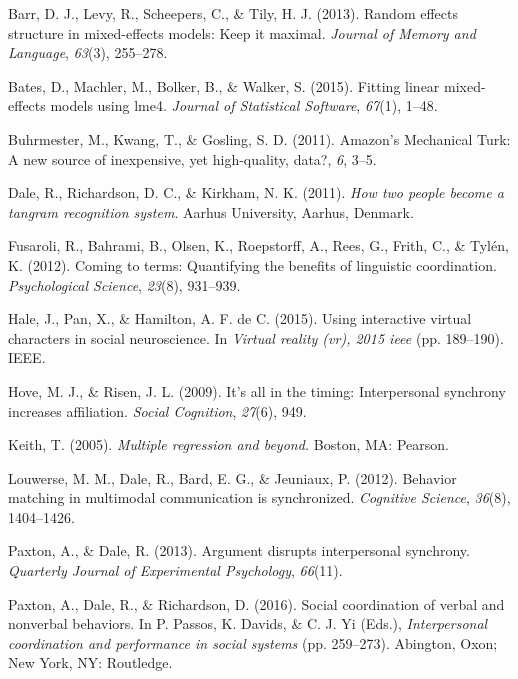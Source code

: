 \documentclass[10pt, letterpaper]{article}
\begin{document}
\hypertarget{refs}{}
\hypertarget{ref-barr2013random}{}
Barr, D. J., Levy, R., Scheepers, C., \& Tily, H. J. (2013). Random
effects structure in mixed-effects models: Keep it maximal.
\emph{Journal of Memory and Language}, \emph{63}(3), 255--278.

\hypertarget{ref-bates2015fitting}{}
Bates, D., Machler, M., Bolker, B., \& Walker, S. (2015). Fitting linear
mixed-effects models using lme4. \emph{Journal of Statistical Software},
\emph{67}(1), 1--48.

\hypertarget{ref-buhrmester2011amazon}{}
Buhrmester, M., Kwang, T., \& Gosling, S. D. (2011). Amazon's Mechanical
Turk: A new source of inexpensive, yet high-quality, data?, \emph{6},
3--5.

\hypertarget{ref-dale2011how}{}
Dale, R., Richardson, D. C., \& Kirkham, N. K. (2011). \emph{How two
people become a tangram recognition system}. Aarhus University, Aarhus,
Denmark.

\hypertarget{ref-fusaroli2012coming}{}
Fusaroli, R., Bahrami, B., Olsen, K., Roepstorff, A., Rees, G., Frith,
C., \& Tylén, K. (2012). Coming to terms: Quantifying the benefits of
linguistic coordination. \emph{Psychological Science}, \emph{23}(8),
931--939.

\hypertarget{ref-hale2015using}{}
Hale, J., Pan, X., \& Hamilton, A. F. de C. (2015). Using interactive
virtual characters in social neuroscience. In \emph{Virtual reality
(vr), 2015 ieee} (pp. 189--190). IEEE.

\hypertarget{ref-hove2009s}{}
Hove, M. J., \& Risen, J. L. (2009). It's all in the timing:
Interpersonal synchrony increases affiliation. \emph{Social Cognition},
\emph{27}(6), 949.

\hypertarget{ref-keith2005multiple}{}
Keith, T. (2005). \emph{Multiple regression and beyond.} Boston, MA:
Pearson.

\hypertarget{ref-louwerse2012behavior}{}
Louwerse, M. M., Dale, R., Bard, E. G., \& Jeuniaux, P. (2012). Behavior
matching in multimodal communication is synchronized. \emph{Cognitive
Science}, \emph{36}(8), 1404--1426.

\hypertarget{ref-paxton2013argument}{}
Paxton, A., \& Dale, R. (2013). Argument disrupts interpersonal
synchrony. \emph{Quarterly Journal of Experimental Psychology},
\emph{66}(11).

\hypertarget{ref-paxton2016social}{}
Paxton, A., Dale, R., \& Richardson, D. (2016). Social coordination of
verbal and nonverbal behaviors. In P. Passos, K. Davids, \& C. J. Yi
(Eds.), \emph{Interpersonal coordination and performance in social
systems} (pp. 259--273). Abington, Oxon; New York, NY: Routledge.
\end{document}
